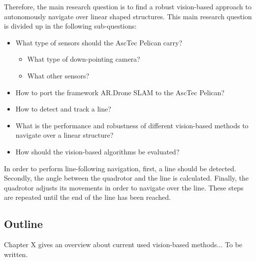 \documentclass[a4paper]{article}
\begin{document}
Therefore, the main research question is to find a robust vision-based approach to autonomously navigate over linear shaped structures. This main research question is divided up in the following sub-questions:
\begin{itemize}
\item What type of sensors should the AscTec Pelican carry?
    \begin{itemize}
        \item What type of down-pointing camera?
        \item What other sensors?
    \end{itemize}
\item How to port the framework AR.Drone SLAM to the AscTec Pelican?
\item How to detect and track a line?
\item What is the performance and robustness of different vision-based methods to navigate over a linear structure?
\item How should the vision-based algorithms be evaluated?
\end{itemize}
In order to perform line-following navigation, first, a line should be detected. Secondly, the angle between the quadrotor and the line is calculated. Finally, the quadrotor adjusts its movements in order to navigate over the line. These steps are repeated until the end of the line has been reached.
\subsection{Outline}
Chapter X gives an overview about current used vision-based methods...
To be written.
\end{document}

